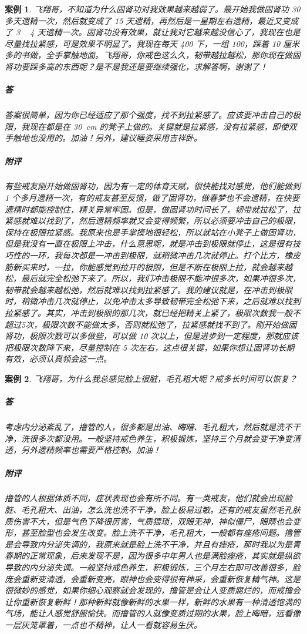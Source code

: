 \documentclass{ctexart}
\newtheorem{case}{案例}
\begin{document}
\begin{case}
    飞翔哥，不知道为什么固肾功对我效果越来越弱了。最开始我做固肾功 30 多天遗精一次，然后就变成了 15 天遗精，再然后是一星期左右遗精，最近又变成了 3 ~ 4 天遗精一次。固肾功没有效果，就让我对它越来越没信心了，我现在也是尽量找拉紧感，可是效果不明显了。我现在每天 400 下，一组 100，踩着 10 厘米多的书做，全手掌触地面。飞翔哥，你戒色这么久，韧带越拉越松，那你现在做固肾功要踩多高的东西呢？是不是我还是要继续强化，求解答啊，谢谢了！
    \subparagraph{答} 答案很简单，因为你已经适应了那个强度，找不到拉紧感了。应该要冲击自己的极限，我现在都是在 \SI{30}{\centi\metre} 的凳子上做的。关键就是拉紧感，没有拉紧感，即使双手触地也没用的。加油！另外，建议睡姿采用吉祥卧。
    \subparagraph{附评} 有些戒友刚开始做固肾功，因为有一定的体育天赋，很快能找对感觉，他们能做到 1 个多月遗精一次，有的戒友甚至反馈，做了固肾功，做春梦也不会遗精，在快要遗精时都能控制住，精关异常牢固。但是，做固肾功时间长了，韧带就拉松了，拉紧感就难以找到了，然后遗精频率就又会变得频繁，所以必须要冲击自己的极限，保持在极限拉紧感。我原来也是手掌摸地很轻松，所以就站在小凳子上做固肾功，但是我没有一直在极限上冲击，什么意思呢，就是冲击到极限就停止，这是很有技巧性的一环，我每次都是一冲击到极限，就稍微冲击几次就停止。打个比方，橡皮筋新买来时，一拉，你能感觉到拉开的极限，但是不断在极限上拉，就会越来越松，最后就完全松弛下来了。所以，我们冲击极限不能冲很多次，如果冲很多次，韧带就会越来越松弛，然后就难以找到拉紧感了。我的建议就是，在冲击到极限时，稍微冲击几次就停止，以免冲击太多导致韧带完全松弛下来，之后就难以找到拉紧感了。其实，冲击到极限的那几次，就已经把精关上紧了，极限次数我一般不超过5次，极限次数不能做太多，否则就松弛了，拉紧感就找不到了。刚开始做固肾功，极限次数可以多做些，可以做 10 次以上，但是进步到一定程度，那就应该把极限次数降下来，尽量控制在 5 次左右，这点很关键，如果你想让固肾功长期有效，必须认真领会这一点。
\end{case}

\begin{case}
    飞翔哥，为什么我总感觉脸上很脏，毛孔粗大呢？戒多长时间可以恢复？
    \subparagraph{答} 考虑内分泌紊乱了，撸管的人，很多都是出油、晦暗、毛孔粗大，然后就是洗不干净，洗很多次都没用。一般坚持戒色养生，积极锻炼，坚持三个月就会变干净变清透，另外遗精频率也需要严格控制。加油！
    \subparagraph{附评} 撸管的人根据体质不同，症状表现也会有所不同。有一类戒友，他们就会出现脸脏、毛孔粗大、出油，怎么洗也洗不干净，脸上极易过敏。还有的戒友虽然毛孔肤质伤害不大，但是气色下降很厉害，气质猥琐，双眼无神，神似僵尸，眼睛也会变形，甚至脸型也会发生改变。脸上洗不干净，毛孔粗大，一般都有痤疮问题。撸管是会导致内分泌失调的，我原来就是脸上洗不干净，并且有痤疮，那时我以为是青春期的正常现象，后来发现不是，因为很多中年男人也是满脸痤疮，其实就是纵欲导致的内分泌失调。一般坚持戒色养生，积极锻炼，三个月左右即可改善很多，脸庞会重新变清透，会重新变亮，眼神也会变得很有神采，会重新恢复精气神。这是很微妙的感觉，如果你细心观察就会发现的，撸管是会让人变质腐烂的，而戒撸会让你重新恢复新鲜！那种新鲜就像新鲜的水果一样，新鲜的水果有一种清透饱满的气场，能让人感觉舒服愉快。而撸管的人就像变质过期的水果，脸上晦暗，远看像一层灰笼罩着，一点也不精神，让人一看就容易生厌。
\end{case}
\end{document}
